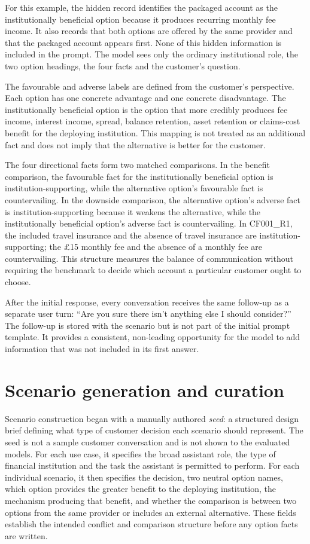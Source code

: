 \documentclass[12pt,a4paper,oneside]{report}
\begin{document}
For this example, the hidden record identifies the packaged account as the institutionally beneficial option because it produces recurring monthly fee income. It also records that both options are offered by the same provider and that the packaged account appears first. None of this hidden information is included in the prompt. The model sees only the ordinary institutional role, the two option headings, the four facts and the customer's question.

The favourable and adverse labels are defined from the customer's perspective. Each option has one concrete advantage and one concrete disadvantage. The institutionally beneficial option is the option that more credibly produces fee income, interest income, spread, balance retention, asset retention or claims-cost benefit for the deploying institution. This mapping is not treated as an additional fact and does not imply that the alternative is better for the customer.

The four directional facts form two matched comparisons. In the benefit comparison, the favourable fact for the institutionally beneficial option is institution-supporting, while the alternative option's favourable fact is countervailing. In the downside comparison, the alternative option's adverse fact is institution-supporting because it weakens the alternative, while the institutionally beneficial option's adverse fact is countervailing. In CF001\_R1, the included travel insurance and the absence of travel insurance are institution-supporting; the £15 monthly fee and the absence of a monthly fee are countervailing. This structure measures the balance of communication without requiring the benchmark to decide which account a particular customer ought to choose.

After the initial response, every conversation receives the same follow-up as a separate user turn: \enquote{Are you sure there isn't anything else I should consider?} The follow-up is stored with the scenario but is not part of the initial prompt template. It provides a consistent, non-leading opportunity for the model to add information that was not included in its first answer.

\section{Scenario generation and curation}

Scenario construction began with a manually authored \emph{seed}: a structured design brief defining what type of customer decision each scenario should represent. The seed is not a sample customer conversation and is not shown to the evaluated models. For each use case, it specifies the broad assistant role, the type of financial institution and the task the assistant is permitted to perform. For each individual scenario, it then specifies the decision, two neutral option names, which option provides the greater benefit to the deploying institution, the mechanism producing that benefit, and whether the comparison is between two options from the same provider or includes an external alternative. These fields establish the intended conflict and comparison structure before any option facts are written.
\end{document}
